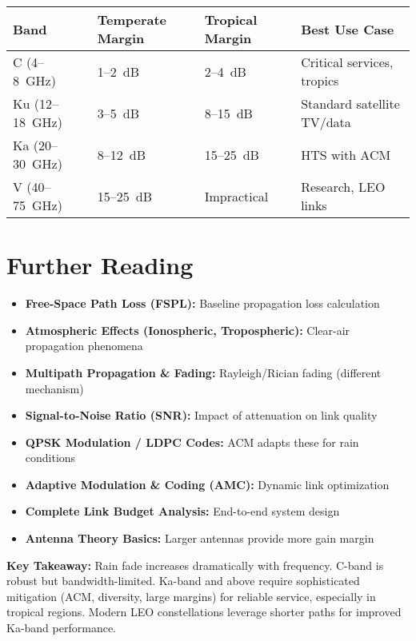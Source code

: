 \begin{center}
\begin{tabular}{@{}llll@{}}
\toprule
Band & Temperate Margin & Tropical Margin & Best Use Case \\
\midrule
C (4--8~GHz) & 1--2~dB & 2--4~dB & Critical services, tropics \\
Ku (12--18~GHz) & 3--5~dB & 8--15~dB & Standard satellite TV/data \\
Ka (20--30~GHz) & 8--12~dB & 15--25~dB & HTS with ACM \\
V (40--75~GHz) & 15--25~dB & Impractical & Research, LEO links \\
\bottomrule
\end{tabular}
\end{center}

\section{Further Reading}

\begin{itemize}
\item \textbf{Free-Space Path Loss (FSPL):} Baseline propagation loss calculation
\item \textbf{Atmospheric Effects (Ionospheric, Tropospheric):} Clear-air propagation phenomena
\item \textbf{Multipath Propagation \& Fading:} Rayleigh/Rician fading (different mechanism)
\item \textbf{Signal-to-Noise Ratio (SNR):} Impact of attenuation on link quality
\item \textbf{QPSK Modulation / LDPC Codes:} ACM adapts these for rain conditions
\item \textbf{Adaptive Modulation \& Coding (AMC):} Dynamic link optimization
\item \textbf{Complete Link Budget Analysis:} End-to-end system design
\item \textbf{Antenna Theory Basics:} Larger antennas provide more gain margin
\end{itemize}

\begin{keyconcept}
\textbf{Key Takeaway:} Rain fade increases dramatically with frequency. C-band is robust but bandwidth-limited. Ka-band and above require sophisticated mitigation (ACM, diversity, large margins) for reliable service, especially in tropical regions. Modern LEO constellations leverage shorter paths for improved Ka-band performance.
\end{keyconcept}

